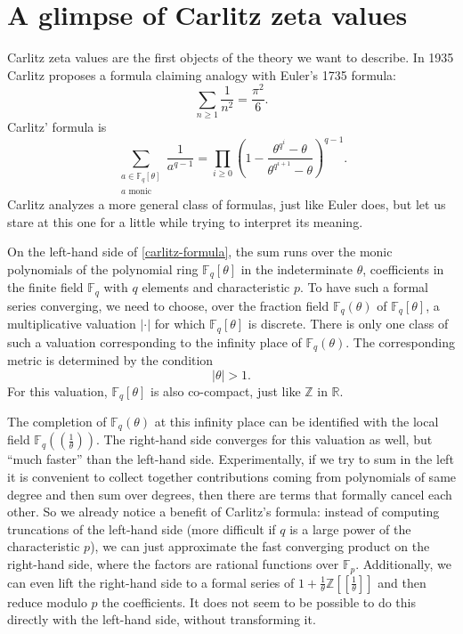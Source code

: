 \documentclass[11pt]{amsart}
\numberwithin{equation}{section}
\newcommand{\ZZ}{\mathbb{Z}}
\newcommand{\FF}{\mathbb{F}}
\newcommand{\RR}{\mathbb{R}}
\begin{document}
\section{A glimpse of Carlitz zeta values}\label{glimpse-Carlitz}

Carlitz zeta values are the first objects of the theory we want to describe.
In 1935 Carlitz \cite{CAR} proposes a formula claiming analogy with Euler's 1735 formula:
$$\sum_{n\geq1}\frac{1}{n^2}=\frac{\pi^2}{6}.$$
Carlitz' formula is
\begin{equation}\label{carlitz-formula}\sum_{\begin{smallmatrix}a\in\FF_q[\theta]\\ \text{$a$ monic}\end{smallmatrix}}\frac{1}{a^{q-1}}=\prod_{i\geq0}\left(1-\frac{\theta^{q^i}-\theta}{\theta^{q^{i+1}}-\theta}\right)^{q-1}.\end{equation}
Carlitz analyzes a more general class of formulas, just like Euler does, but let us stare at this one for a little while trying to interpret its meaning. 

On the left-hand side of \eqref{carlitz-formula}, the sum runs over the monic polynomials of the polynomial ring
$\FF_q[\theta]$ in the indeterminate $\theta$, coefficients in the finite field $\FF_q$ with $q$ elements and characteristic $p$.
To have such a formal series converging, we need to choose, over the fraction field $\FF_q(\theta)$ of $\FF_q[\theta]$, a multiplicative valuation $|\cdot|$ for which $\FF_q[\theta]$ is discrete. There is only one class of such a valuation corresponding to the infinity place of $\FF_q(\theta)$. The corresponding metric is determined by the condition $$|\theta|>1.$$
For this valuation, $\FF_q[\theta]$ is also co-compact, just like $\ZZ$ in $\RR$. 

The completion of $\FF_q(\theta)$ at this infinity place 
can be identified with the local field $\FF_q((\frac{1}{\theta}))$. The right-hand side converges for this valuation as well, but 
``much faster'' than the left-hand side. Experimentally, if we try to sum in the left it is convenient to collect together contributions coming from polynomials of same degree and then sum over degrees, then there are terms that formally cancel each other. So we already notice a benefit of Carlitz's formula: instead of computing truncations of the left-hand side
(more difficult if $q$ is a large power of the characteristic $p$), we can just approximate the fast converging
product on the right-hand side, where the factors are rational functions over $\FF_p$. Additionally, we can even lift the right-hand side to a formal series of $1+\frac{1}{\theta}\ZZ[[\frac{1}{\theta}]]$ and then reduce modulo $p$ the coefficients. It does not seem to be possible to do this directly with the left-hand side, without transforming it.
\end{document}
